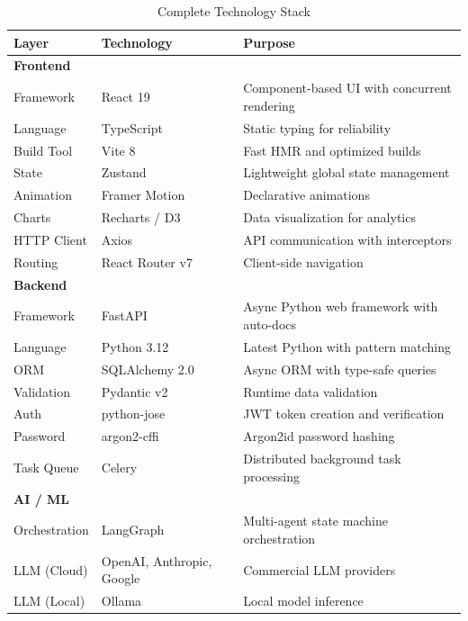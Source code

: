 \documentclass[12pt, a4paper]{report}
\begin{document}
\begin{table}[H]
\centering
\caption{Complete Technology Stack}
\label{tab:techstack}
\small
\begin{tabular}{p{2.5cm}|p{3.5cm}|p{7.5cm}}
\toprule
\textbf{Layer} & \textbf{Technology} & \textbf{Purpose} \\
\midrule
\multicolumn{3}{l}{\textbf{Frontend}} \\
\midrule
Framework      & React 19            & Component-based UI with concurrent rendering \\
Language       & TypeScript          & Static typing for reliability \\
Build Tool     & Vite 8              & Fast HMR and optimized builds \\
State          & Zustand             & Lightweight global state management \\
Animation      & Framer Motion       & Declarative animations \\
Charts         & Recharts / D3       & Data visualization for analytics \\
HTTP Client    & Axios               & API communication with interceptors \\
Routing        & React Router v7     & Client-side navigation \\
\midrule
\multicolumn{3}{l}{\textbf{Backend}} \\
\midrule
Framework      & FastAPI             & Async Python web framework with auto-docs \\
Language       & Python 3.12         & Latest Python with pattern matching \\
ORM            & SQLAlchemy 2.0      & Async ORM with type-safe queries \\
Validation     & Pydantic v2         & Runtime data validation \\
Auth           & python-jose         & JWT token creation and verification \\
Password       & argon2-cffi         & Argon2id password hashing \\
Task Queue     & Celery              & Distributed background task processing \\
\midrule
\multicolumn{3}{l}{\textbf{AI / ML}} \\
\midrule
Orchestration  & LangGraph           & Multi-agent state machine orchestration \\
LLM (Cloud)    & OpenAI, Anthropic, Google & Commercial LLM providers \\
LLM (Local)    & Ollama              & Local model inference \\

\end{tabular}
\end{table}
\end{document}
